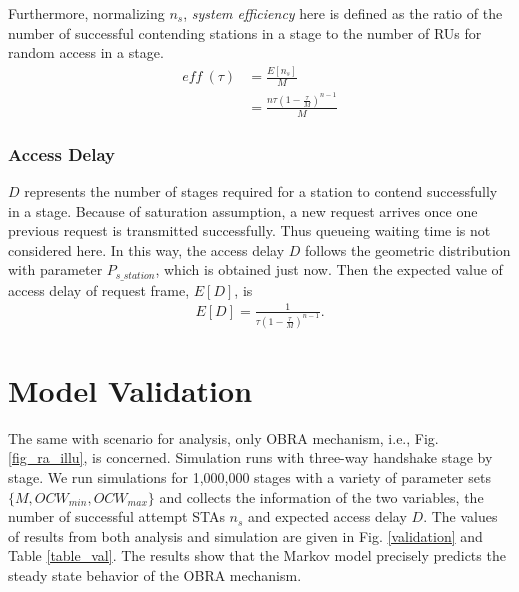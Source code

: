 \documentclass[journal]{IEEEtran}
\begin{document}
Furthermore, normalizing $n_s$, \textit{system efficiency} here is defined as the ratio of the number of successful contending stations in a stage to the number of RUs for random access in a stage.
\begin{align}
\label{eff_def}
\textit{eff}\ (\tau) &=\frac{E[n_s]}{M} \nonumber \\
					 &= \frac{n\tau(1-\frac{\tau}{M})^{n-1}}{M}
\end{align}


	
\subsubsection{Access Delay}
$D$ represents the number of stages required for a station to contend successfully in a stage. 
Because of saturation assumption, a new request arrives once one previous request is transmitted successfully.
Thus queueing waiting time is not considered here. 
In this way, the access delay $D$ follows the geometric distribution with parameter $P_{s\_station}$, which is obtained just now.  
Then the expected value of access delay of request frame, $E[D]$, is 
\begin{align}
\label{equ_delay}
E[D] = \frac{1}{\tau (1-\frac{\tau}{M})^{n-1}}.
\end{align}




\section{Model Validation} 		\label{sec_model_val}
The same with scenario for analysis, only OBRA mechanism, i.e., Fig. \ref{fig_ra_illu}, is concerned.
Simulation runs with three-way handshake stage by stage.
We run simulations for 1,000,000 stages with a variety of parameter sets $\lbrace M, OCW_{min}, OCW_{max}\rbrace$ and collects the information of the two variables, the number of successful attempt STAs $n_s$ and expected access delay $D$. 
The values of results from both analysis and simulation are given in Fig. \ref{validation} and Table \ref{table_val}. 
The results show that the Markov model precisely predicts the steady state behavior of the OBRA mechanism.
\end{document}
